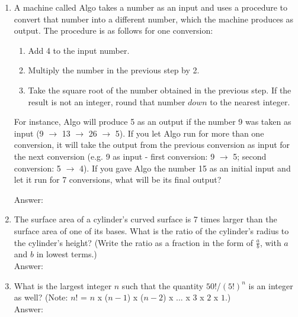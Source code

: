 \documentclass[12pt]{article}
\begin{document}
\begin{enumerate}
    \item {A machine called Algo takes a number as an input and uses a procedure to convert that number into a different number, which the machine produces as output. The procedure is as follows for one conversion:
    
    \begin{enumerate}
        \item {Add 4 to the input number.}
        \item {Multiply the number in the previous step by 2.}
        \item {Take the square root of the number obtained in the previous step. If the result is not an integer, round that number $down$ to the nearest integer.}
    \end{enumerate}
    
    For instance, Algo will produce 5 as an output if the number 9 was taken as input (9 $\rightarrow$ 13 $\rightarrow$ 26 $\rightarrow$ 5).  If you let Algo run for more than one conversion, it will take the output from the previous conversion as input for the next conversion (e.g. 9 as input - first conversion: 9 $\rightarrow$ 5; second conversion: 5 $\rightarrow$ 4). If you gave Algo the number 15 as an initial input and let it run for 7 conversions, what will be its final output?}{ Answer: }
    
    \item {The surface area of a cylinder's curved surface is 7 times larger than the surface area of one of its bases. What is the ratio of the cylinder's radius to the cylinder's height? (Write the ratio as a fraction in the form of $\frac{a}{b}$, with $a$ and $b$ in lowest terms.)}{\\Answer: }
    
    \item {What is the largest integer $n$ such that the quantity $50!$/$(5!)^n$ is an integer as well? (Note: $n!$ = $n$ x ($n-1$) x ($n-2$) x ... x $3$ x $2$ x $1$.)}{\\Answer: }
\end{enumerate}
\end{document}
